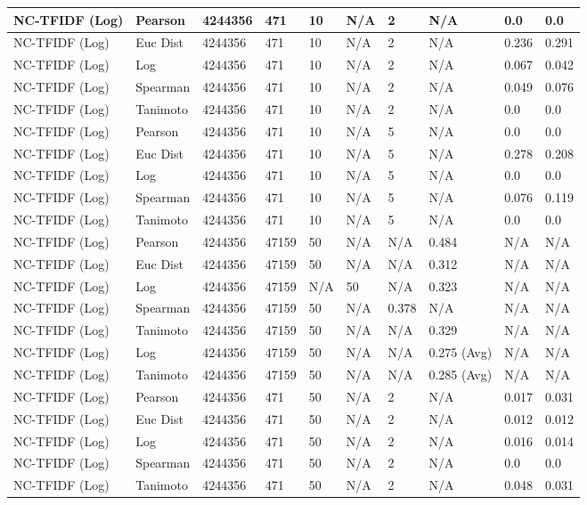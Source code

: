 \documentclass{article}
\begin{document}
\begin{longtable}{ |p{1.7cm}|p{1.9cm}|p{1.5cm}|p{1.5cm}|p{0.75cm}|p{0.75cm}|p{0.75cm}|p{0.75cm}|p{1.5cm}|p{1.5cm}|}
    NC-TFIDF (Log)  & Pearson & 4244356 & 471 & 10 & N/A  & 2 & N/A & 0.0 & 0.0  \\ \hline
    NC-TFIDF (Log)  & Euc Dist & 4244356 & 471 & 10 & N/A  & 2 & N/A &0.236 & 0.291   \\ \hline
    NC-TFIDF (Log)  & Log & 4244356 & 471 & 10 & N/A & 2 & N/A & 0.067 & 0.042  \\ \hline
    NC-TFIDF (Log)  & Spearman & 4244356 & 471 & 10 & N/A  & 2 & N/A &0.049 & 0.076 \\ \hline
    NC-TFIDF (Log)  & Tanimoto & 4244356 & 471 & 10 & N/A  & 2 & N/A & 0.0 & 0.0 \\ \hline
    
    NC-TFIDF (Log)  & Pearson & 4244356 & 471 & 10 & N/A  & 5 & N/A & 0.0 & 0.0  \\ \hline
    NC-TFIDF (Log)  & Euc Dist & 4244356 & 471 & 10 & N/A  & 5 & N/A &0.278 & 0.208   \\ \hline
    NC-TFIDF (Log)  & Log & 4244356 & 471 & 10 & N/A & 5 & N/A & 0.0 & 0.0  \\ \hline
    NC-TFIDF (Log)  & Spearman & 4244356 & 471 & 10 & N/A  & 5 & N/A &0.076 & 0.119 \\ \hline
    NC-TFIDF (Log)  & Tanimoto & 4244356 & 471 & 10 & N/A  & 5 & N/A & 0.0 & 0.0 \\ \hline
    
    NC-TFIDF (Log) & Pearson & 4244356 & 47159 & 50 & N/A & N/A & 0.484 & N/A & N/A  \\ \hline
    NC-TFIDF (Log) & Euc Dist & 4244356 & 47159 & 50 & N/A & N/A & 0.312 & N/A & N/A   \\ \hline
    NC-TFIDF (Log) & Log & 4244356 & 47159 & N/A &  50 & N/A& 0.323 & N/A & N/A  \\ \hline
    NC-TFIDF (Log) & Spearman & 4244356 & 47159 & 50 & N/A & 0.378 & N/A & N/A & N/A \\ \hline
    NC-TFIDF (Log) & Tanimoto & 4244356 & 47159 & 50 & N/A& N/A & 0.329 & N/A & N/A \\ \hline
    NC-TFIDF (Log) & Log & 4244356 & 47159 & 50 & N/A& N/A & 0.275 (Avg) & N/A & N/A \\ \hline
    NC-TFIDF (Log) & Tanimoto & 4244356 & 47159 & 50 & N/A & N/A & 0.285 (Avg) & N/A & N/A \\ \hline
    
    NC-TFIDF (Log)  & Pearson & 4244356 & 471 & 50 & N/A  & 2 & N/A & 0.017 & 0.031  \\ \hline
    NC-TFIDF (Log)  & Euc Dist & 4244356 & 471 & 50 & N/A  & 2 & N/A &0.012 & 0.012   \\ \hline
    NC-TFIDF (Log)  & Log & 4244356 & 471 & 50 & N/A & 2 & N/A & 0.016 & 0.014  \\ \hline
    NC-TFIDF (Log)  & Spearman & 4244356 & 471 & 50 & N/A  & 2 & N/A &0.0 & 0.0 \\ \hline
    NC-TFIDF (Log)  & Tanimoto & 4244356 & 471 & 50 & N/A  & 2 & N/A & 0.048 & 0.031 \\ \hline
    

\end{longtable}
\end{document}
